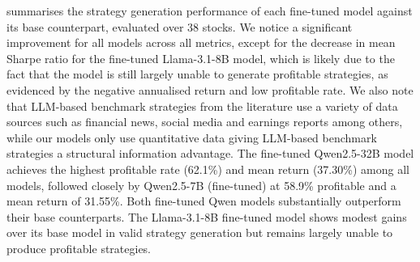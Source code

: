 \documentclass[conference]{IEEEtran}
\begin{document}
 summarises the strategy generation performance of each fine-tuned
model against its base counterpart, evaluated over 38 stocks. We notice a significant improvement
for all models across all metrics, except for the decrease in mean Sharpe ratio for the
fine-tuned Llama-3.1-8B model, which is likely due to the fact that the model is still largely
unable to generate profitable strategies, as evidenced by the negative annualised return and low
profitable rate.
We also note that LLM-based benchmark strategies from the literature use a variety of data
sources such as financial news, social media and earnings reports among others, while our models
only use quantitative data giving LLM-based benchmark strategies a structural information advantage.
The fine-tuned Qwen2.5-32B model achieves the highest profitable rate (62.1\%) and mean return
(37.30\%) among all models, followed closely by Qwen2.5-7B (fine-tuned) at 58.9\% profitable and a
mean return of 31.55\%. Both fine-tuned Qwen models substantially outperform their base counterparts.
The Llama-3.1-8B fine-tuned model shows modest gains over its base model in valid strategy
generation but remains largely unable to produce profitable strategies.

\begin{table}[t]
  \centering
  \caption{Strategy generation performance of fine-tuned vs.\ base models.}
  \label{tab:model-comparison}
\end{table}
\end{document}
